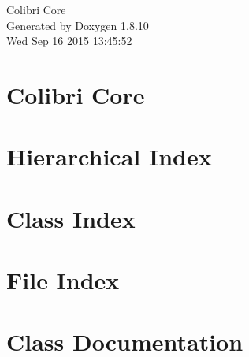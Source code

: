 \documentclass[twoside]{book}
\newcommand{\+}{\discretionary{\mbox{\scriptsize$\hookleftarrow$}}{}{}}
\newcommand{\clearemptydoublepage}{%
  \newpage{\pagestyle{empty}\cleardoublepage}%
}
\begin{document}
\hypersetup{pageanchor=false,
             bookmarks=true,
             bookmarksnumbered=true,
             pdfencoding=unicode
            }
\begin{titlepage}
\vspace*{7cm}
\begin{center}%
{\Large Colibri Core }\\
\vspace*{1cm}
{\large Generated by Doxygen 1.8.10}\\
\vspace*{0.5cm}
{\small Wed Sep 16 2015 13:45:52}\\
\end{center}
\end{titlepage}
\clearemptydoublepage
\tableofcontents
\clearemptydoublepage
{}
\hypersetup{pageanchor=true}

\chapter{Colibri Core}
\label{index}\hypertarget{index}{}
\chapter{Hierarchical Index}

\chapter{Class Index}

\chapter{File Index}

\chapter{Class Documentation}





































\end{document}
